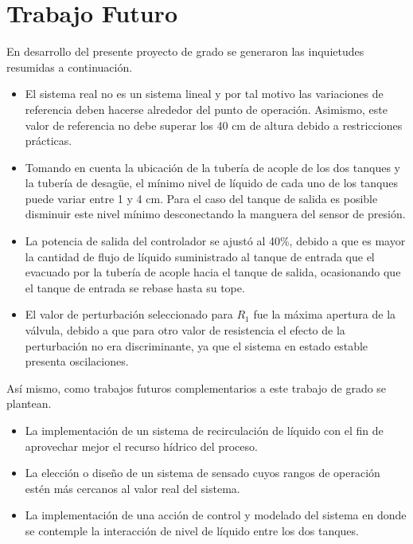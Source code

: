 \documentclass[a4paper,12pt,twoside]{proyectotanquesecci}
\begin{document}

\chapter{Trabajo Futuro}

En desarrollo del presente proyecto de grado se generaron las inquietudes resumidas a continuación. \\

\begin{itemize}
\item El sistema real no es un sistema lineal y por tal motivo las variaciones de referencia deben hacerse alrededor del punto de operación. Asimismo, este valor de referencia no debe superar los 40 cm de altura debido a restricciones prácticas.
\item Tomando en cuenta la ubicación de la tubería de acople de los dos tanques y la tubería de desagüe, el mínimo nivel de líquido de cada uno de los tanques puede variar entre 1 y 4 cm. Para el caso del tanque de salida es posible disminuir este nivel mínimo desconectando la manguera del sensor de presión.
\item La potencia de salida del controlador se ajustó al 40\%, debido a que es mayor la cantidad de flujo de líquido suministrado al tanque de entrada que el evacuado por la tubería de acople hacia el tanque de salida, ocasionando que el tanque de entrada se rebase hasta su tope.
\item El valor de perturbación seleccionado para $R_{1}$ fue la máxima apertura de la válvula, debido a que para otro valor de resistencia el efecto de la perturbación no era discriminante, ya que el sistema en estado estable presenta oscilaciones.
\end{itemize}

Así mismo, como trabajos futuros complementarios a este trabajo de grado se plantean. \\

\begin{itemize}
\item La implementación de un sistema de recirculación de líquido con el fin de aprovechar mejor el recurso hídrico del proceso.
\item La elección o diseño de un sistema de sensado cuyos rangos de operación estén más cercanos al valor real del sistema.
\item La implementación de una acción de control y modelado del sistema en donde se contemple la interacción de nivel de líquido entre los dos tanques.
\end{itemize}
\end{document}
